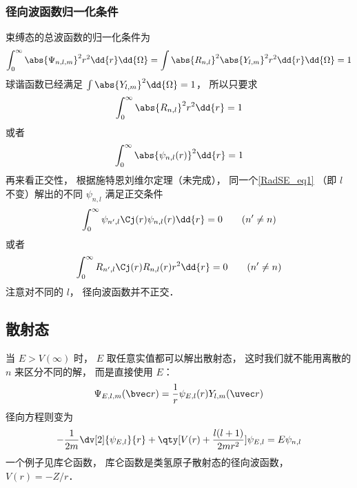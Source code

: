 \subsubsection{径向波函数归一化条件}
束缚态的总波函数的归一化条件为
\begin{equation}
\int_0^\infty \abs{\Psi_{n,l,m}}^2 r^2\dd{r} \dd{\Omega} = \int \abs{R_{n,l}}^2 \abs{Y_{l,m}}^2 r^2\dd{r} \dd{\Omega}  = 1
\end{equation}
球谐函数已经满足 $\int \abs{Y_{l,m}}^2 \dd{\Omega} = 1$，  所以只要求
\begin{equation}\label{RadSE_eq5}
\int_0^\infty \abs{R_{n,l}}^2 r^2 \dd{r}  = 1
\end{equation}
或者
\begin{equation}
\int_0^\infty \abs{\psi_{n,l}(r)}^2 \dd{r}  = 1
\end{equation}
再来看正交性， 根据施特恩刘维尔定理（未完成）， 同一个\autoref{RadSE_eq1} （即 $l$ 不变）解出的不同 $\psi_{n,l}$ 满足正交条件
\begin{equation}
\int_0^\infty \psi_{n', l}\Cj(r) \psi_{n,l}(r) \dd{r} = 0 \qquad (n' \ne n)
\end{equation}
或者
\begin{equation}\label{RadSE_eq7}
\int_0^\infty R_{n', l}\Cj(r) R_{n,l}(r) r^2 \dd{r} = 0 \qquad (n' \ne n)
\end{equation}
注意对不同的 $l$， 径向波函数并不正交．

\subsection{散射态}
当 $E > V(\infty)$ 时， $E$ 取任意实值都可以解出散射态， 这时我们就不能用离散的 $n$ 来区分不同的解， 而是直接使用 $E$：
\begin{equation}
\Psi_{E, l,m}(\bvec r) = \frac{1}{r}\psi_{E, l}(r) Y_{l,m}(\uvec r)
\end{equation}
径向方程则变为
\begin{equation}
-\frac{1}{2m} \dv[2]{\psi_{E, l}}{r} + \qty[V(r) + \frac{l(l + 1)}{2mr^2}]\psi_{E, l} = E \psi_{n, l}
\end{equation}
一个例子见库仑函数， 库仑函数是类氢原子散射态的径向波函数， $V(r) = -Z/r$．

